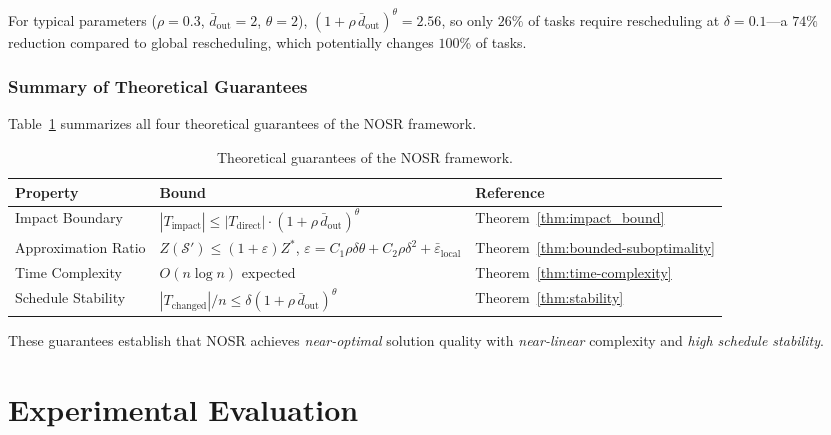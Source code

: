 \documentclass[manuscript,screen,review]{acmart}
\begin{document}
\begin{corollary}
For typical parameters ($\rho{=}0.3$, $\bar{d}_{\mathrm{out}}{=}2$,
$\theta{=}2$), $(1+\rho\,\bar{d}_{\mathrm{out}})^\theta = 2.56$, so
only $26\%$ of tasks require rescheduling at $\delta{=}0.1$---a
$74\%$ reduction compared to global rescheduling, which potentially
changes $100\%$ of tasks.
\end{corollary}

\subsubsection{Summary of Theoretical Guarantees}

Table~\ref{tab:theory_summary} summarizes all four theoretical guarantees of the NOSR framework.

\begin{table}[t]
    \centering
    \caption{Theoretical guarantees of the NOSR framework.}
    \label{tab:theory_summary}
    \small
    \begin{tabular}{@{}lll@{}}
        \toprule
        \textbf{Property} & \textbf{Bound} & \textbf{Reference} \\
        \midrule
        Impact Boundary &
        $|T_{\mathrm{impact}}| \leq |T_{\mathrm{direct}}| \cdot
        (1 + \rho\, \bar{d}_{\mathrm{out}})^\theta$ &
        Theorem~\ref{thm:impact_bound} \\
        Approximation Ratio &
        $Z(\mathcal{S}') \leq (1+\varepsilon)Z^*$,\;
        $\varepsilon = C_1\rho\delta\theta + C_2\rho\delta^2 + \bar{\varepsilon}_{\mathrm{local}}$ &
        Theorem~\ref{thm:bounded-suboptimality} \\
        Time Complexity &
        $O(n \log n)$ expected &
        Theorem~\ref{thm:time-complexity} \\
        Schedule Stability &
        $|T_{\mathrm{changed}}|/n \leq \delta(1+\rho\,\bar{d}_{\mathrm{out}})^\theta$ &
        Theorem~\ref{thm:stability} \\
        \bottomrule
    \end{tabular}
\end{table}

These guarantees establish that NOSR achieves \textit{near-optimal} solution quality with \textit{near-linear} complexity and \textit{high schedule stability}.

\section{Experimental Evaluation}
\label{sec:experiments}
\end{document}

